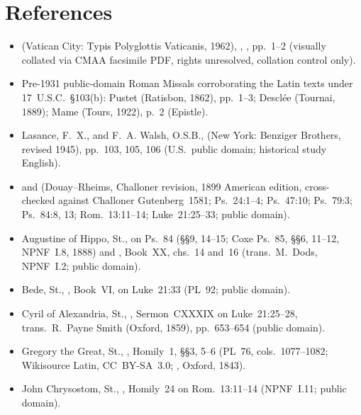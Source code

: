 \section{References}

{\small
\begin{itemize}[itemsep=0.05em,topsep=0.2em]
\item {} (Vatican City: Typis Polyglottis Vaticanis, 1962), , , pp.~1--2 (visually collated via CMAA facsimile PDF, rights unresolved, collation control only).
\item Pre-1931 public-domain Roman Missals corroborating the Latin texts under 17~U.S.C.~\S103(b): Pustet (Ratisbon, 1862), pp.~1--3; Descl\'ee (Tournai, 1889); Mame (Tours, 1922), p.~2 (Epistle).
\item Lasance, F.~X., and F.~A. Walsh, O.S.B.,  (New York: Benziger Brothers, revised 1945), pp.~103, 105, 106 (U.S.~public domain; historical study English).
\item {} and  (Douay--Rheims, Challoner revision, 1899 American edition, cross-checked against Challoner Gutenberg~1581; Ps.~24:1--4; Ps.~47:10; Ps.~79:3; Ps.~84:8, 13; Rom.~13:11--14; Luke~21:25--33; public domain).
\item Augustine of Hippo, St.,  on Ps.~84 (\S\S9, 14--15; Coxe Ps.~85, \S\S6, 11--12, NPNF~I.8, 1888) and , Book~XX, chs.~14 and~16 (trans.\ M.~Dods, NPNF~I.2; public domain).
\item Bede, St., , Book~VI, on Luke~21:33 (PL~92; public domain).
\item Cyril of Alexandria, St., , Sermon~CXXXIX on Luke~21:25--28, trans.\ R.~Payne Smith (Oxford, 1859), pp.~653--654 (public domain).
\item Gregory the Great, St., , Homily~1, \S\S3, 5--6 (PL~76, cols.~1077--1082; Wikisource Latin, CC~BY-SA~3.0; , Oxford, 1843).
\item John Chrysostom, St., , Homily~24 on Rom.~13:11--14 (NPNF~I.11; public domain).
\end{itemize}
}
